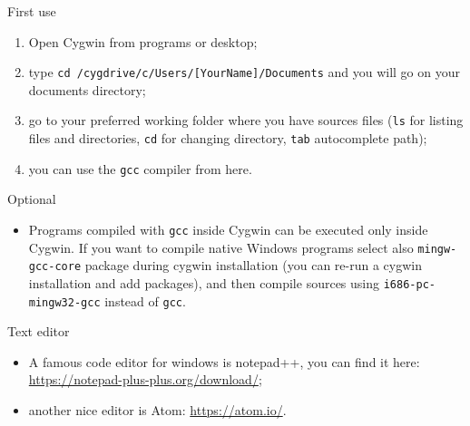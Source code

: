 \begin{frame}
  \small
  \begin{block}{First use}
    \begin{enumerate}
    \item Open Cygwin from programs or desktop;
    \item type \alert{\texttt{cd
          /cygdrive/c/Users/[YourName]/Documents}} and you will go on
      your documents directory;
    \item go to your preferred working folder where you have sources
      files (\alert{\texttt{ls}} for listing files and directories,
      \alert{\texttt{cd}} for changing directory, \alert{\texttt{tab}}
      autocomplete path);
    \item you can use the \alert{\texttt{gcc}} compiler from here.
    \end{enumerate}
  \end{block}
  \begin{block}{Optional}
    \begin{itemize}
    \item Programs compiled with \alert{\texttt{gcc}} inside Cygwin
      can be executed only inside Cygwin.
      If you want to compile native Windows programs select also
      \alert{\texttt{mingw-gcc-core}} package during cygwin installation
      (you can re-run a cygwin installation and add packages), and then
      compile sources using \alert{\texttt{i686-pc-mingw32-gcc}} instead
      of \alert{\texttt{gcc}}.
    \end{itemize}
  \end{block}
\end{frame}

\begin{frame}
  \begin{block}{Text editor}
    \begin{itemize}
    \item A famous code editor for windows is \alert{notepad++}, you can
      find it here: \url{https://notepad-plus-plus.org/download/};
    \item another nice editor is \alert{Atom}: \url{https://atom.io/}.
    \end{itemize}
  \end{block}  
\end{frame}

